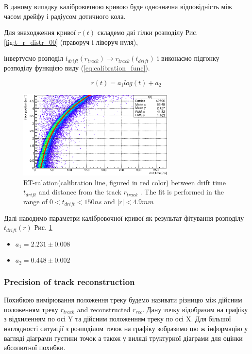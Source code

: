 \documentclass[]{article}
\begin{document}
	
	В даному випадку калібровочною кривою буде однозначна відповідність між часом дрейфу і радіусом дотичного кола.
	
	Для знаходження кривої $r(t)$ складемо дві гілки розподілу Рис. \ref{fig:t_r_distr_00} (праворуч і ліворуч нуля), 
	
	
	 інвертуємо розподіл $t_{drift}(r_{track}) \longrightarrow r_{track}(t_{drift})$ і виконаємо підгонку розподілу функцією виду (\ref{eq:calibration_func}).
	
	\begin{equation}
		\label{eq:calibration_func}
		r(t) = a_1 log(t) + a_2
	\end{equation}
	
	\begin{figure}[h]
	\includegraphics[width=0.7\textwidth]{rt_calibration.eps}
	\centering
	\caption{ RT-ralation(calibration line, figured in red color) between drift time $t_{drift}$ and distance from the  track $r_{track}$ .  The fit is performed in the range of
$0 < t_{drift} < 150 ns$ and $|r| < 4.9mm$ }
	\label{fig:calibration_00}
	\end{figure}
	
	Далі наводимо параметри калібровочної кривої як результат фітування розподілу $t_{drift}(r)$ Рис. \ref{fig:calibration_00} 
	
	\begin{itemize}
		\item $a_1 = 2.231 \pm 0.008$
		\item $a_2 = 0.448 \pm 0.002$
	\end{itemize}
	
	\subsubsection{Precision of track reconstruction}
	Похибкою вимірювання положення треку будемо називати різницю між дійсним положенням треку $r_{track}$ and reconstructed $r_{rec}$. Дану точку відобразим на графіку з відхиленням по осі Y та дійсним положенням треку по осі X. Для більшої наглядності ситуації з розподілом точок на графіку зобразимо цю ж інформацію у вагляді діаграми густини точок а також у виляді труктурної діаграми для  оцінки абсолютної похибки.
	
\end{document}

